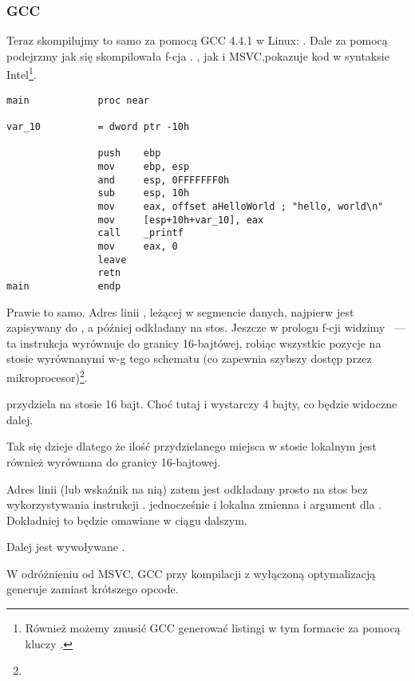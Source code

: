 \subsubsection{GCC}

Teraz skompilujmy to samo za pomocą GCC 4.4.1 w Linux: .
Dale za pomocą \IDA podejrzmy jak się skompilowała f-cja \main.
\IDA, jak i MSVC,pokazuje kod w syntaksie Intel\footnote{Również możemy zmusić GCC generować listingi w tym formacie za pomocą kluczy .}.

\begin{lstlisting}[caption=kod w \IDA,style=customasmx86]
main            proc near

var_10          = dword ptr -10h

                push    ebp
                mov     ebp, esp
                and     esp, 0FFFFFFF0h
                sub     esp, 10h
                mov     eax, offset aHelloWorld ; "hello, world\n"
                mov     [esp+10h+var_10], eax
                call    _printf
                mov     eax, 0
                leave
                retn
main            endp
\end{lstlisting}

Prawie to samo. 
Adres linii , leżącej w segmencie danych, najpierw jest zapisywany do \EAX, a później odkładany na stos.
Jeszcze w prologu f-cji widzimy ~--- 
ta instrukcja wyrównuje \ESP do granicy 16-bajtówej, robiąc wszystkie pozycje 
na stosie wyrównanymi w-g tego schematu (co zapewnia szybszy dostęp przez mikroprocesor)\footnote{\URLWPDA}.

 przydziela na stosie 16 bajt. Choć tutaj i wystarczy 4 bajty, co będzie widoczne dalej.

Tak się dzieje dlatego że ilość przydzielanego miejsca w stosie lokalnym jest również wyrównana do granicy 16-bajtowej.

Adres linii (lub wskaźnik na nią) zatem jest odkładany prosto na stos bez wykorzystywania instrukcji \PUSH.
 jednocześnie i lokalna zmienna i argument dla \printf{}. Dokładniej to będzie omawiane w ciągu dalszym.

Dalej jest wywoływane \printf.

W odróżnieniu od MSVC, GCC przy kompilacji z wyłączoną optymalizacją generuje  zamiast krótszego opcode.


